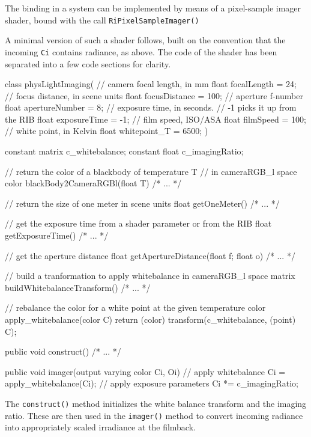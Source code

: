 The binding in a  system can be implemented by means of a
pixel-sample imager shader, bound with the call \Verb|RiPixelSampleImager()|

A minimal version of such a shader follows, built on the convention that the
incoming \Verb|Ci| contains radiance, as above. The code of the shader has been
separated into a few code sections for clarity.

\begin{rslcode}
class physLightImaging(
    // camera focal length, in mm
    float focalLength = 24;
    // focus distance, in scene units
    float focusDistance = 100;
    // aperture f-number
    float apertureNumber = 8;
    // exposure time, in seconds.
    // -1 picks it up from the RIB
    float exposureTime = -1;
    // film speed, ISO/ASA
    float filmSpeed = 100;
    // white point, in Kelvin
    float whitepoint_T = 6500;
)
{
    constant matrix c_whitebalance;
    constant float  c_imagingRatio;

    // return the color of a blackbody of temperature T
    // in cameraRGB\_l space
    color blackBody2CameraRGBl(float T) { /* ... */ }

    // return the size of one meter in scene units
    float getOneMeter() { /* ... */ }

    // get the exposure time from a shader parameter or from the RIB
    float getExposureTime() { /* ... */ }

    // get the aperture distance
    float getApertureDistance(float f; float o) { /* ... */ }

    // build a tranformation to apply whitebalance in cameraRGB\_l space
    matrix buildWhitebalanceTransform() { /* ... */ }

    // rebalance the color for a white point at the given temperature
    color apply_whitebalance(color C)
    {
        return (color) transform(c_whitebalance, (point) C);
    }

    public void construct() { /* ... */ }

    public void imager(output varying color Ci, Oi)
    {
        // apply whitebalance
        Ci = apply_whitebalance(Ci);
        // apply exposure parameters
        Ci *= c_imagingRatio;
    }
}
\end{rslcode}


The \Verb|construct()| method initializes the white balance transform and the
imaging ratio. These are then used in the \Verb|imager()| method to convert
incoming radiance into appropriately scaled irradiance at the filmback.

